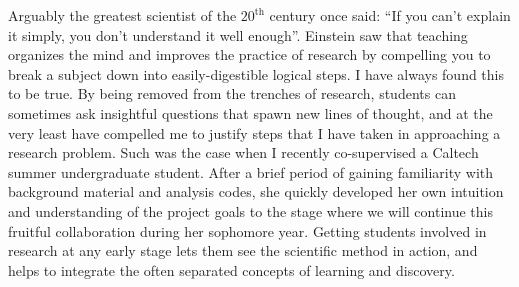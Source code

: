 \documentclass[11pt,letterpaper,sans]{moderncv} %
\begin{document}
Arguably the greatest scientist of the $20^\mathrm{th}$ century once said: ``If you can't explain it simply, you don't understand it well enough''. Einstein saw that teaching organizes the mind and improves the practice of research by compelling you to break a subject down into easily-digestible logical steps. I have always found this to be true. %
By being removed from the trenches of research, students can sometimes ask insightful questions that spawn new lines of thought, and at the very least have compelled me to justify steps that I have taken in approaching a research problem. Such was the case when I recently co-supervised a Caltech summer undergraduate student. After a brief period of gaining familiarity with background material and analysis codes, she quickly developed her own intuition and understanding of the project goals to the stage where we will continue this fruitful collaboration during her sophomore year. Getting students involved in research at any early stage lets them see the scientific method in action, and helps to integrate the often separated concepts of learning and discovery.
\vspace{2mm}

\end{document}
